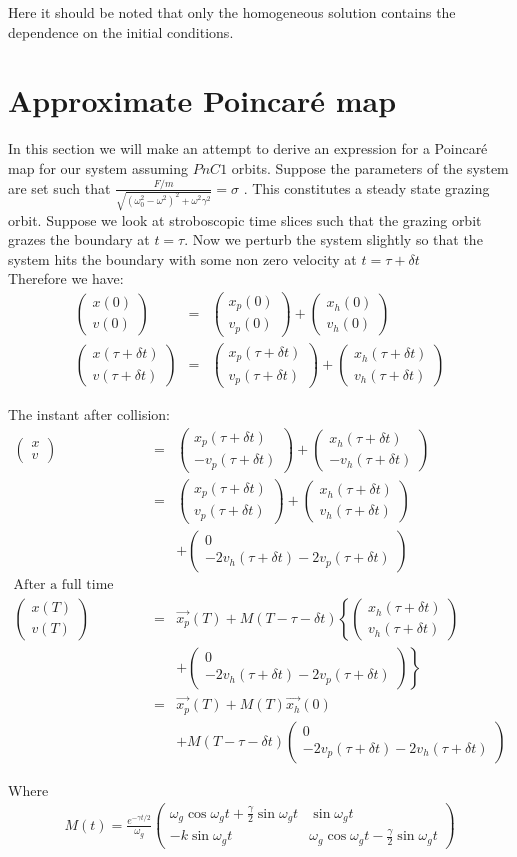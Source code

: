 \documentclass{book}
\renewcommand{\(}{\begin{columns}}
\renewcommand{\)}{\end{columns}}
\newcommand{\<}[1]{\begin{column}{#1}}
\renewcommand{\>}{\end{column}}
\newcommand{\colv}[2]{\begin{pmatrix}#1\\#2\end{pmatrix}}
\begin{document}
Here it should be noted that only the homogeneous solution contains the 
dependence on the initial conditions.  

\section{Approximate Poincaré map}
In this section we will make an attempt to derive an expression for a Poincaré 
map for our system assuming $PnC1$ orbits.  
Suppose the parameters of the system are set such that 
$\frac{F/m}{\sqrt{(\omega_0^2-\omega^2)^2+\omega^2\gamma^2}}=\sigma$
. This constitutes a steady state grazing orbit. Suppose we look at stroboscopic time slices such that the grazing orbit grazes 
the boundary at $t=\tau$. Now we perturb the system slightly so that the system hits the boundary with 
some non zero velocity at $t=\tau+\delta t$\\

Therefore we have:
\begin{eqnarray*}
\colv{x(0)}{v(0)}&=&\colv{x_p(0)}{v_p(0)}+\colv{x_h(0)}{v_h(0)}\\
\colv{x(\tau+\delta t)}{v(\tau+\delta t)}&=&\colv{x_p(\tau+\delta t)}{v_p(\tau+\delta t)}+\colv{x_h(\tau+\delta t)}{v_h(\tau+\delta t)}
\end{eqnarray*}
 

The instant after collision:\\
\begin{eqnarray*}
\colv{x}{v}&=&\colv{x_p(\tau+\delta t)}{-v_p(\tau+\delta t)}+\colv{x_h(\tau+\delta t)}{-v_h(\tau+\delta t)}\\
&=&\colv{x_p(\tau+\delta t)}{v_p(\tau+\delta t)}+\colv{x_h(\tau+\delta t)}{v_h(\tau+\delta t)}\\
& &+\colv{0}{-2v_h(\tau+\delta t)-2v_p(\tau+\delta t)} \\
\text{After a full time period T:}&&\\
\colv{x(T)}{v(T)}
&=&\vec{x_p}(T)+M(T-\tau-\delta t)\left\{\colv{x_h(\tau+\delta t)}{v_h(\tau+\delta t)}\right.\\
& &\left.+\colv{0}{-2v_h(\tau+\delta t)-2v_p(\tau+\delta t)}\right\}\\
&=&\vec{x_p}(T)+M(T)\vec{x_h}(0)\\&&+M(T-\tau-\delta t)\colv{0}{-2v_p(\tau+\delta t)-2v_h(\tau+\delta t)}
\end{eqnarray*}

Where 
\begin{eqnarray}
\label{def-huge-M-matrix}
M(t)=\frac{e^{-\gamma t/2}}{\omega_g}
\begin{pmatrix}
\omega_g\cos{\omega_g t}+\frac{\gamma}{2}\sin{\omega_g t} & \sin{\omega_g t}\\
-k\sin{\omega_g t} & \omega_g\cos{\omega_g t}-\frac{\gamma}{2}\sin{\omega_g t}
\end{pmatrix}
\end{eqnarray}
\end{document}
